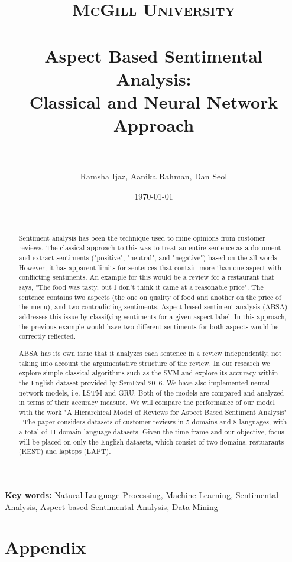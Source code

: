 \documentclass[paper=a4, fontsize=11pt]{scrartcl} %
\title{	
\normalfont \normalsize 
\textsc{McGill University} \\ [25pt] %
\horrule{0.5pt} \\[0.4cm] %
\huge{Aspect Based Sentimental Analysis:} \\ %
Classical and Neural Network Approach\\
\horrule{2pt} \\[0.5cm] %
}
\author{Ramsha Ijaz, Aanika Rahman, Dan Seol} %
\date{\normalsize\today} %
\numberwithin{equation}{section} %
\numberwithin{figure}{section} %
\numberwithin{table}{section} %
\begin{document}
\maketitle %

\newpage
\begin{abstract}

{ }\\
\par Sentiment analysis has been the technique used to mine opinions from customer reviews. The classical approach to this was to treat an entire sentence as a document and extract sentiments ("positive", "neutral", and "negative") based on the all words. However, it has apparent limits for sentences that contain more than one aspect with conflicting sentiments. An example for this would be a review for a restaurant that says, "The food was tasty, but I don’t think it came at a reasonable price". The sentence contains two aspects (the one on quality of food and another on the price of the menu), and two contradicting sentiments. Aspect-based sentiment analysis (ABSA) addresses this issue by classifying sentiments for a given aspect label. In this approach, the previous example would have two different sentiments for both aspects would be correctly reflected.

\par ABSA has its own issue that it analyzes each sentence in a review independently, not taking into account the argumentative structure of the review. In our research we explore simple classical algorithms such as the SVM and explore its accuracy within the English dataset provided by SemEval 2016. We have also implemented neural network models, i.e. LSTM and GRU. Both of the models are compared and analyzed in terms of their accuracy measure.
We will compare the performance of our model with the work "A Hierarchical Model of Reviews for Aspect Based Sentiment Analysis" \cite{T1-P2}. The paper considers datasets of customer reviews in 5 domains and 8 languages, with a total of 11 domain-language datasets. Given the time frame and our objective, focus will be placed on only the English datasets, which consist of two domains, restuarants (REST) and laptops (LAPT). \\

\end{abstract}
\textbf{Key words:} Natural Language Processing, Machine Learning, Sentimental Analysis, Aspect-based Sentimental Analysis, Data Mining 
\newpage
\section*{Appendix}


\end{document}
